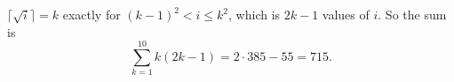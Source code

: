 $\lceil\sqrt i\rceil=k$ exactly for $(k-1)^2<i\le k^2$, which is $2k-1$ values of $i$. So the sum is
\[\sum_{k=1}^{10}k(2k-1)=2\cdot385-55=\boxed{715}.\]

